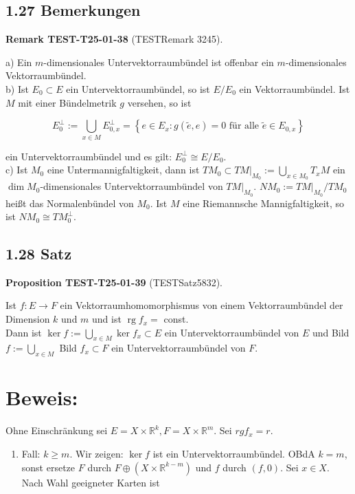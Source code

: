 \documentclass[10pt, letterpaper]{article}
\newcommand{\CustomHeading}[3]{%
  \par\medskip\noindent%
  \textbf{#1 #2} \textnormal{(#3)}.\enskip%
}
\newenvironment{PROP}[2]{\begin{unitbox}\CustomHeading{Proposition}{#1}{#2}}{\end{unitbox}}
\newenvironment{REM}[2]{\begin{unitbox}\CustomHeading{Remark}{#1}{#2}}{\end{unitbox}}
\begin{document}
\subsection*{1.27 Bemerkungen}
\begin{REM}{TEST-T25-01-38}{TESTRemark 3245}
a) Ein $m$-dimensionales Untervektorraumbündel ist offenbar ein $m$-dimensionales Vektorraumbündel.\\
b) Ist $E_{0} \subset E$ ein Untervektorraumbündel, so ist $E / E_{0}$ ein Vektorraumbündel. Ist $M$ mit einer Bündelmetrik $g$ versehen, so ist

$$
E_{0}^{\perp}:=\bigcup_{x \in M} E_{0, x}^{\perp}=\left\{e \in E_{x}: g(\tilde{e}, e)=0 \text { für alle } \tilde{e} \in E_{0, x}\right\}
$$

ein Untervektorraumbündel und es gilt: $E_{0}^{\perp} \cong E / E_{0}$.\\
c) Ist $M_{0}$ eine Untermannigfaltigkeit, dann ist $\left.T M_{0} \subset T M\right|_{M_{0}}:=\bigcup_{x \in M_{0}} T_{x} M$ ein $\operatorname{dim} M_{0}$-dimensionales Untervektorraumbündel von $\left.T M\right|_{M_{0}}$. $N M_{0}:=\left.T M\right|_{M_{0}} / T M_{0}$ heißt das Normalenbündel von $M_{0}$. Ist $M$ eine Riemannsche Mannigfaltigkeit, so ist $N M_{0} \cong T M_{0}^{\perp}$.
\end{REM}

\subsection*{1.28 Satz}
\begin{PROP}{TEST-T25-01-39}{TESTSatz5832}
Ist $f: E \rightarrow F$ ein Vektorraumhomomorphismus von einem Vektorraumbündel der Dimension $k$ und $m$ und ist $\operatorname{rg} f_{x}=$ const.\\
Dann ist $\operatorname{ker} f:=\bigcup_{x \in M} \operatorname{ker} f_{x} \subset E$ ein Untervektorraumbündel von $E$ und Bild $f:=\bigcup_{x \in M}$ Bild $f_{x} \subset F$ ein Untervektorraumbündel von $F$.
\end{PROP}

\section*{Beweis:}
Ohne Einschränkung sei $E=X \times \mathbb{R}^{k}, F=X \times \mathbb{R}^{m}$. Sei $r g f_{x}=r$.

\begin{enumerate}
  \item Fall: $k \geq m$. Wir zeigen: $\operatorname{ker} f$ ist ein Untervektorraumbündel. OBdA $k=m$, sonst ersetze $F$ durch $F \oplus\left(X \times \mathbb{R}^{k-m}\right)$ und $f$ durch $(f, 0)$. Sei $x \in X$. Nach Wahl geeigneter Karten ist
\end{enumerate}
\end{document}
